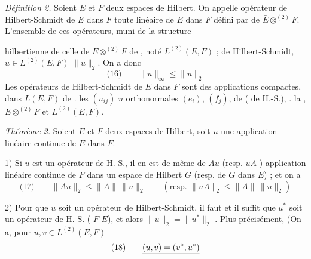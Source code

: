 \documentclass[11pt,a4paper]{article}
\begin{document}
\emph{Définition 2.} Soient $E$ et $F$ deux espaces de Hilbert. On appelle opérateur de Hilbert-Schmidt de $E$ dans $F$ \struck{\ill{}} toute  linéaire de $E$ dans $F$ défini par   de $\bar{E} \otimes^{(2)} F$. L'ensemble de ces opérateurs, muni de la structure

hilbertienne  de celle de $\bar{E} \otimes^{(2)} F$   de ,   noté $L^{(2)}(E,F)$  ;   de Hilbert-Schmidt,   $u \in L^{(2)}(E,F)$   $\|u\|_2$. On a \struck{\ill{}} donc
\[
  \text{(16)}\qquad \|u\|_{\infty} \leq \|u\|_2
\]
Les opérateurs de Hilbert-Schmidt de $E$ dans $F$ sont des applications compactes,   dans $L(E,F)$  de  . \ill{} \ill{} \struck{\ill{}} les  $(u_{ij})$ \ill{} \ill{} \ill{}  \ill{} \ill{} \ill{}  $u$ \ill{} orthonormales $(e_i)$, $(f_j)$, \struck{\ill{}} de   (   de H.-S.), .  la ,   $\bar{E} \otimes^{(2)} F$ et $L^{(2)}(E,F)$.


\emph{Théorème 2.}  Soient $E$ et $F$ deux espaces de Hilbert, soit $u$ une  application linéaire continue de $E$ dans $F$. 

1) Si $u$ est un opérateur de H.-S., \struck{\ill{}} il en est de même de $Au$ (resp. $uA$ )  \struck{\ill{}} application linéaire continue de $F$ dans \struck{\ill{}} un espace de Hilbert $G$ (resp. de $G$ dans $E$) ; et on a
\[
  \text{(17)}\qquad \|Au\|_2 \leq \|A\|\,\|u\|_2 \qquad (\text{resp. } \|uA\|_2 \leq \|A\|\,\|u\|_2)
\]

2) Pour que $u$ soit un opérateur de Hilbert-Schmidt, il faut et il suffit que $u^{*}$ soit un opérateur de H.-S. ( $F$  $E$), et alors $\|u\|_2 = \|u^{*}\|_2$ . Plus précisément, (On a, pour $u, v \in L^{(2)}(E,F)$
\[
  \text{(18)}\qquad \struck{(u, v) = (v^{*}, u^{*})}
\]
\end{document}
